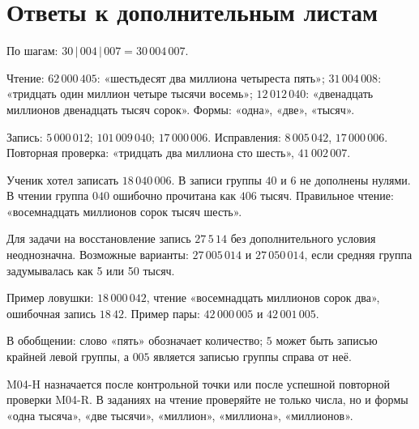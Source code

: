 \newpage
\section{Ответы к дополнительным листам}

\begin{teacherbox}[Ответы M04-R]
  По шагам: \(30\,|\,004\,|\,007=30\,004\,007\).

  Чтение: \(62\,000\,405\): «шестьдесят два миллиона четыреста пять»;
  \(31\,004\,008\): «тридцать один миллион четыре тысячи восемь»;
  \(12\,012\,040\): «двенадцать миллионов двенадцать тысяч сорок».
  Формы: «одна», «две», «тысяч».

  Запись: \(5\,000\,012\); \(101\,009\,040\); \(17\,000\,006\).
  Исправления: \(8\,005\,042\), \(17\,000\,006\).
  Повторная проверка: «тридцать два миллиона сто шесть»,
  \(41\,002\,007\).
\end{teacherbox}

\begin{teacherbox}
  Ученик хотел записать \(18\,040\,006\). В записи группы \(40\) и \(6\) не
  дополнены нулями. В чтении группа \(040\) ошибочно прочитана как \(406\)
  тысяч. Правильное чтение: «восемнадцать миллионов сорок тысяч шесть».

  Для задачи на восстановление запись \(27\,5\,14\) без дополнительного
  условия неоднозначна. Возможные варианты: \(27\,005\,014\) и
  \(27\,050\,014\), если средняя группа задумывалась как 5 или 50 тысяч.

  Пример ловушки: \(18\,000\,042\), чтение «восемнадцать миллионов сорок
  два», ошибочная запись \(18\,42\). Пример пары: \(42\,000\,005\) и
  \(42\,001\,005\).

  В обобщении: слово «пять» обозначает количество; \(5\) может быть записью
  крайней левой группы, а \(005\) является записью группы справа от неё.
\end{teacherbox}

\begin{notebox}
  M04-H назначается после контрольной точки или после успешной повторной
  проверки M04-R. В заданиях на чтение проверяйте не только числа, но и формы
  «одна тысяча», «две тысячи», «миллион», «миллиона», «миллионов».
\end{notebox}
